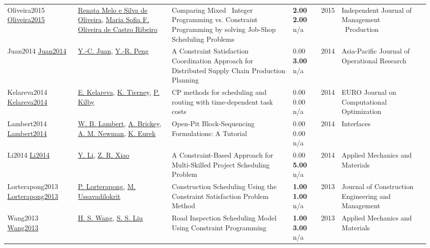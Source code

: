 {\begin{longtable}{p{3cm}p{5cm}p{10cm}p{1cm}rp{2.5cm}l}
Oliveira2015 \href{http://dx.doi.org/10.14807/ijmp.v6i1.262}{Oliveira2015} & \hyperref[auth:a1566]{Renata Melo e Silva de Oliveira}, \hyperref[auth:a1567]{Maria Sofia F. Oliveira de Castro Ribeiro} & Comparing Mixed \  Integer Programming vs. Constraint Programming by solving Job-Shop Scheduling Problems & \noindent{}\textbf{2.00} \textbf{2.00} n/a & 2015 & Independent Journal of Management \  Production & \cite{Oliveira2015}\\
Juan2014 \href{http://dx.doi.org/10.1142/s0217595914500419}{Juan2014} & \hyperref[auth:a1978]{Y.-C. Juan}, \hyperref[auth:a1979]{Y.-R. Peng} & A Constraint Satisfaction Coordination Approach for Distributed Supply Chain Production Planning & \noindent{}\textcolor{black!50}{0.00} \textbf{3.00} n/a & 2014 & Asia-Pacific Journal of Operational Research & \cite{Juan2014}\\
Kelareva2014 \href{http://dx.doi.org/10.1007/s13675-014-0022-7}{Kelareva2014} & \hyperref[auth:a332]{E. Kelareva}, \hyperref[auth:a333]{K. Tierney}, \hyperref[auth:a334]{P. Kilby} & \cellcolor{gold!20}CP methods for scheduling and routing with time-dependent task costs & \noindent{}\textcolor{black!50}{0.00} \textcolor{black!50}{0.00} n/a & 2014 & EURO Journal on Computational Optimization & \cite{Kelareva2014}\\
Lambert2014 \href{http://dx.doi.org/10.1287/inte.2013.0731}{Lambert2014} & \hyperref[auth:a1556]{W. B. Lambert}, \hyperref[auth:a1557]{A. Brickey}, \hyperref[auth:a1558]{A. M. Newman}, \hyperref[auth:a1559]{K. Eurek} & Open-Pit Block-Sequencing Formulations: A Tutorial & \noindent{}\textcolor{black!50}{0.00} \textcolor{black!50}{0.00} n/a & 2014 & \cellcolor{red!20}Interfaces & \cite{Lambert2014}\\
Li2014 \href{http://dx.doi.org/10.4028/www.scientific.net/amm.681.265}{Li2014} & \hyperref[auth:a1490]{Y. Li}, \hyperref[auth:a1491]{Z. R. Xiao} & A Constraint-Based Approach for Multi-Skilled Project Scheduling Problem & \noindent{}\textcolor{black!50}{0.00} \textbf{5.00} n/a & 2014 & Applied Mechanics and Materials & \cite{Li2014}\\
Lorterapong2013 \href{http://dx.doi.org/10.1061/(asce)co.1943-7862.0000582}{Lorterapong2013} & \hyperref[auth:a1789]{P. Lorterapong}, \hyperref[auth:a1790]{M. Ussavadilokrit} & Construction Scheduling Using the Constraint Satisfaction Problem Method & \noindent{}\textbf{1.00} \textbf{1.00} n/a & 2013 & Journal of Construction Engineering and Management & \cite{Lorterapong2013}\\
Wang2013 \href{http://dx.doi.org/10.4028/www.scientific.net/amm.357-360.2720}{Wang2013} & \hyperref[auth:a1900]{H. S. Wang}, \hyperref[auth:a1901]{S. S. Liu} & Road Inspection Scheduling Model Using Constraint Programming & \noindent{}\textbf{1.00} \textbf{3.00} n/a & 2013 & Applied Mechanics and Materials & \cite{Wang2013}\\

\end{longtable}}
